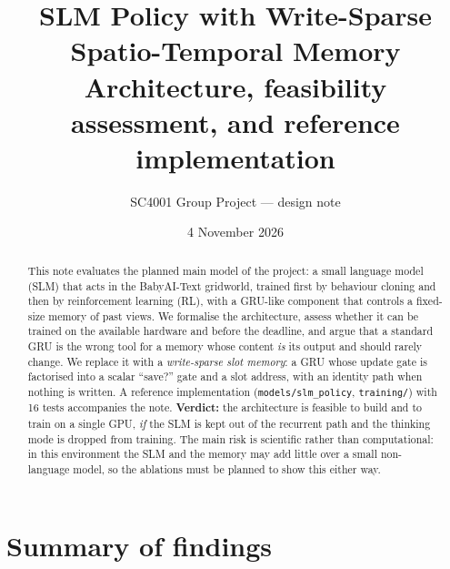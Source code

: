 \documentclass[11pt,a4paper]{article}
\title{\textbf{SLM Policy with Write-Sparse Spatio-Temporal Memory}\\[2pt]
\large Architecture, feasibility assessment, and reference implementation}
\author{SC4001 Group Project --- design note}
\date{4 November 2026}
\newcommand{\code}[1]{\texttt{\small #1}}
\begin{document}
\maketitle

\begin{abstract}
\noindent This note evaluates the planned main model of the project: a small language model (SLM) that acts in the
BabyAI-Text gridworld, trained first by behaviour cloning and then by reinforcement learning (RL), with a GRU-like
component that controls a fixed-size memory of past views. We formalise the architecture, assess whether it can be
trained on the available hardware and before the deadline, and argue that a standard GRU is the wrong tool for a memory
whose content \emph{is} its output and should rarely change. We replace it with a \emph{write-sparse slot memory}: a
GRU whose update gate is factorised into a scalar ``save?'' gate and a slot address, with an identity path when nothing
is written. A reference implementation (\code{models/slm\_policy}, \code{training/}) with 16 tests accompanies the note.
\textbf{Verdict:} the architecture is feasible to build and to train on a single GPU, \emph{if} the SLM is kept out of
the recurrent path and the thinking mode is dropped from training. The main risk is scientific rather than
computational: in this environment the SLM and the memory may add little over a small non-language model, so the
ablations must be planned to show this either way.
\end{abstract}

\tableofcontents
\bigskip

\section{Summary of findings}
\end{document}
